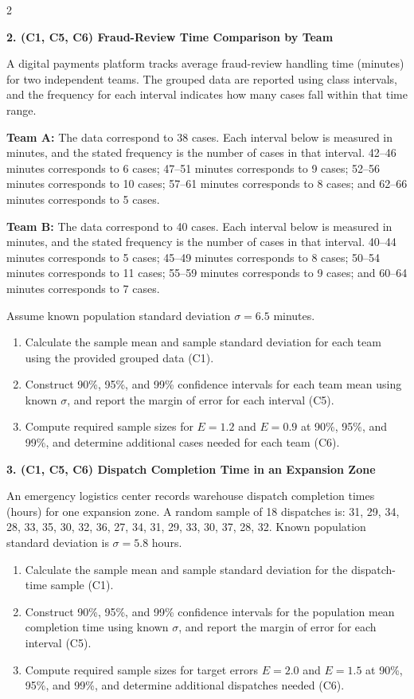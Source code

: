 \documentclass[12pt]{article}
\newcommand{\SubsectionBox}[1]{%
	\noindent\colorbox{gray!30}{%
		\parbox{\linewidth}{\textbf{#1}}%
	}\par\vspace{0.35cm}%
}
\begin{document}
\begin{multicols}{2}
		\vspace{0.25cm}
		\SubsectionBox{2. (C1, C5, C6) Fraud-Review Time Comparison by Team}\vspace{-0.25cm}
		A digital payments platform tracks average fraud-review handling time (minutes) for two independent teams.
		The grouped data are reported using class intervals, and the frequency for each interval indicates how many cases fall within that time range.
		
		\textbf{Team A:} The data correspond to 38 cases. Each interval below is measured in minutes, and the stated frequency is the number of cases in that interval. 42--46 minutes corresponds to 6 cases; 47--51 minutes corresponds to 9 cases; 52--56 minutes corresponds to 10 cases; 57--61 minutes corresponds to 8 cases; and 62--66 minutes corresponds to 5 cases.
		
		\textbf{Team B:} The data correspond to 40 cases. Each interval below is measured in minutes, and the stated frequency is the number of cases in that interval. 40--44 minutes corresponds to 5 cases; 45--49 minutes corresponds to 8 cases; 50--54 minutes corresponds to 11 cases; 55--59 minutes corresponds to 9 cases; and 60--64 minutes corresponds to 7 cases.
		
		Assume known population standard deviation $\sigma=6.5$ minutes.
		\begin{enumerate}
			\item Calculate the sample mean and sample standard deviation for each team using the provided grouped data (C1).
			\item Construct 90\%, 95\%, and 99\% confidence intervals for each team mean using known $\sigma$, and report the margin of error for each interval (C5).
			\item Compute required sample sizes for $E=1.2$ and $E=0.9$ at 90\%, 95\%, and 99\%, and determine additional cases needed for each team (C6).
		\end{enumerate}
		
		\vspace{0.25cm}
		\SubsectionBox{3. (C1, C5, C6) Dispatch Completion Time in an Expansion Zone}\vspace{-0.25cm}
		An emergency logistics center records warehouse dispatch completion times (hours) for one expansion zone.
		A random sample of 18 dispatches is:
		31, 29, 34, 28, 33, 35, 30, 32, 36, 27, 34, 31, 29, 33, 30, 37, 28, 32.
		Known population standard deviation is $\sigma=5.8$ hours.
		\begin{enumerate}
			\item Calculate the sample mean and sample standard deviation for the dispatch-time sample (C1).
			\item Construct 90\%, 95\%, and 99\% confidence intervals for the population mean completion time using known $\sigma$, and report the margin of error for each interval (C5).
			\item Compute required sample sizes for target errors $E=2.0$ and $E=1.5$ at 90\%, 95\%, and 99\%, and determine additional dispatches needed (C6).
		\end{enumerate}
		

\end{multicols}
\end{document}
